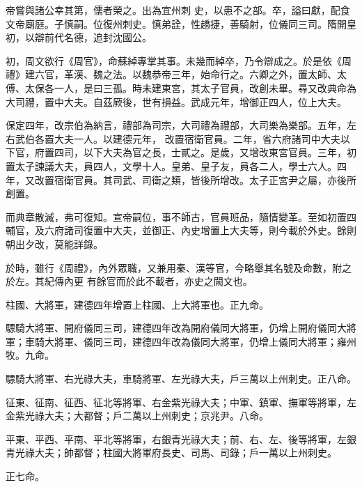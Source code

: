\begin{pinyinscope}
 帝嘗與諸公幸其第，儒者榮之。出為宜州刺
 史，以患不之部。卒，謚曰獻，配食文帝廟庭。子慎嗣。位復州刺史。慎弟詮，性趫捷，善騎射，位儀同三司。隋開皇初，以辯前代名德，追封沈國公。



 初，周文欲行《周官》，命蘇綽專掌其事。未幾而綽卒，乃令辯成之。於是依《周禮》建六官，革漢、魏之法。以魏恭帝三年，始命行之。六卿之外，置太師、太傅、太保各一人，是曰三孤。時未建東宮，其太子官員，改創未畢。尋又改典命為大司禮，置中大夫。自茲厥後，世有損益。武成元年，增御正四人，位上大夫。



 保定四年，改宗伯為納言，禮部為司宗，大司禮為禮部，大司樂為樂部。五年，左右武伯各置大夫一人。以建德元年，
 改置宿衛官員。二年，省六府諸司中大夫以下官，府置四司，以下大夫為官之長，士貳之。是歲，又增改東宮官員。三年，初置太子諫議大夫，員四人，文學十人。皇弟、皇子友，員各二人，學士六人。四年，又改置宿衛官員。其司武、司衛之類，皆後所增改。太子正宮尹之屬，亦後所創置。



 而典章散滅，弗可復知。宣帝嗣位，事不師古，官員班品，隨情變革。至如初置四輔官，及六府諸司復置中大夫，並御正、內史增置上大夫等，則今載於外史。餘則朝出夕改，莫能詳錄。



 於時，雖行《周禮》，內外眾職，又兼用秦、漢等官，今略舉其名號及命數，附之於左。其紀傳內更
 有餘官而於此不載者，亦史之闕文也。



 柱國、大將軍，建德四年增置上柱國、上大將軍也。正九命。



 驃騎大將軍、開府儀同三司，建德四年改為開府儀同大將軍，仍增上開府儀同大將軍；車騎大將軍、儀同三司，建德四年改為儀同大將軍，仍增上儀同大將軍；雍州牧。九命。



 驃騎大將軍、右光祿大夫，車騎將軍、左光祿大夫，戶三萬以上州刺史。正八命。



 征東、征南、征西、征北等將軍、右金紫光祿大夫；中軍、鎮軍、撫軍等將軍，左金紫光祿大夫；大都督；戶二萬以上州刺史；京兆尹。八命。



 平東、平西、平南、平北等將軍，右銀青光祿大夫；前、右、左、後等將軍，左銀
 青光祿大夫；帥都督；柱國大將軍府長史、司馬、司錄；戶一萬以上州刺史。



 正七命。




\end{pinyinscope}
